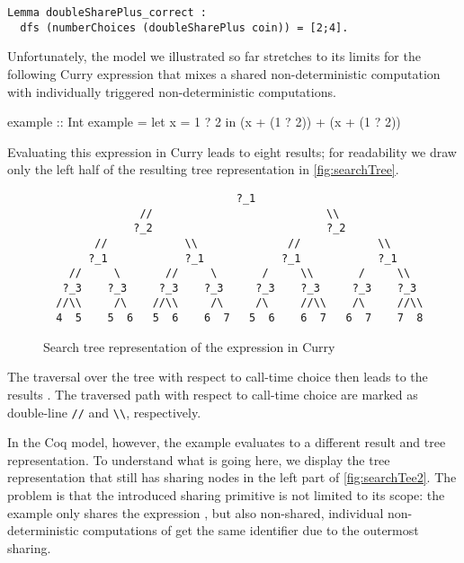 \begin{verbatim}
Lemma doubleSharePlus_correct :
  dfs (numberChoices (doubleSharePlus coin)) = [2;4].
\end{verbatim}

Unfortunately, the model we illustrated so far stretches to its limits for the following Curry expression that mixes a shared non-deterministic computation with individually triggered non-deterministic computations.

\begin{curry}
example :: Int
example = let x = 1 ? 2 in (x + (1 ? 2)) + (x + (1 ? 2))  
\end{curry}

Evaluating this expression in Curry leads to eight results; for readability we draw only the left half of the resulting tree representation in \autoref{fig:searchTree}.

\begin{figure}[h]
\centering
\begin{BVerbatim}
                              ?_1
               //                           \\
              ?_2                           ?_2
        //            \\              //            \\
       ?_1            ?_1            ?_1            ?_1
    //     \       //     \       /     \\       /     \\
   ?_3    ?_3     ?_3    ?_3     ?_3    ?_3     ?_3    ?_3
  //\\     /\    //\\     /\     /\     //\\    /\     //\\
  4  5    5  6   5  6    6  7   5  6    6  7   6  7    7  8
\end{BVerbatim}
\caption{Search tree representation of the expression 
  in Curry}
\label{fig:searchTree}
\end{figure}

The traversal over the tree with respect to call-time choice then leads to the results .
The traversed path with respect to call-time choice are marked as double-line \verb|//| and \verb|\\|, respectively.

In the Coq model, however, the example evaluates to a different result and tree representation.
To understand what is going here, we display the tree representation that still has sharing nodes in the left part of \autoref{fig:searchTee2}.
The problem is that the introduced sharing primitive is not limited to its scope: the example only shares the expression , but also non-shared, individual non-deterministic computations of  get the same identifier due to the outermost sharing.

